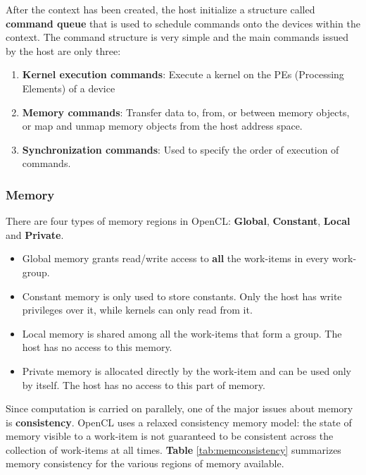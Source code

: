 After the context has been created, the host initialize a structure called \textbf{command queue} that is used to schedule commands onto the devices within the context. The command structure is very simple and the main commands issued by the host are only three:

\begin{enumerate}
	\item \textbf{Kernel execution commands}: Execute a kernel on the PEs (Processing Elements) of a device
	\item \textbf{Memory commands}: Transfer data to, from, or between memory objects, or map and unmap
memory objects from the host address space.
	\item	\textbf{Synchronization commands}: Used to specify the order of execution of commands.
\end{enumerate}

\subsubsection{Memory}

There are four types of memory regions in OpenCL: \textbf{Global}, \textbf{Constant}, \textbf{Local} and \textbf{Private}.

\begin{itemize}
	\item Global memory grants read/write access to \textbf{all} the work-items in every work-group.
	\item Constant memory is only used to store constants. Only the host has write privileges over it, while kernels can only read from it.
	\item Local memory is shared among all the work-items that form a group. The host has no access to this memory.
	\item Private memory is allocated directly by the work-item and can be used only by itself. The host has no access to this part of memory.
\end{itemize}

Since computation is carried on parallely, one of the major issues about memory is \textbf{consistency}. OpenCL uses a relaxed consistency memory model: the state of memory visible to a work-item is not guaranteed to be consistent across the collection of work-items at all times. \textbf{Table} \ref{tab:memconsistency} summarizes memory consistency for the various regions of memory available.\\

